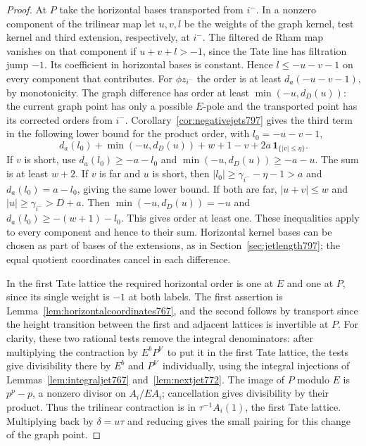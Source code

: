 \documentclass[a4paper,11pt]{article}
\theoremstyle{definition}
\theoremstyle{remark}
\numberwithin{equation}{section}
\begin{document}
\begin{proof}
At \(P\) take the horizontal bases transported from \(i^-\).
In a nonzero component of the trilinear map let \(u,v,l\)
be the weights of the graph kernel, test kernel and third
extension, respectively, at \(i^-\). The filtered de Rham
map vanishes on that component if \(u+v+l>-1\), since
the Tate line has filtration jump \(-1\). Its coefficient
in horizontal bases is constant. Hence \(l\le -u-v-1\)
on every component that contributes. For \(\phi z_{i^-}\)
the order is at least \(d_a(-u-v-1)\), by monotonicity.
The graph difference has order at least \(\min(-u,d_D(u))\):
the current graph point has only a possible \(E\)-pole
and the transported point has its corrected orders from
\(i^-\). Corollary~\ref{cor:negativejets797} gives the
third term in the following lower bound for the product order,
with \(l_0=-u-v-1\),
\[
           d_a(l_0)+\min(-u,d_D(u))
                + w+1-v+2a\,\mathbf 1_{\{|v|\le\eta\}} .
\]
If \(v\) is short, use \(d_a(l_0)\ge-a-l_0\) and
\(\min(-u,d_D(u))\ge-a-u\). The sum is at least \(w+2\).
If \(v\) is far and \(u\) is short, then
\(|l_0|\ge\gamma_{i^-}-\eta-1>a\) and \(d_a(l_0)=a-l_0\),
giving the same lower bound. If both are far,
\(|u+v|\le w\) and \(|u|\ge\gamma_{i^-}>D+a\).
Then \(\min(-u,d_D(u))=-u\) and
\(d_a(l_0)\ge-(w+1)-l_0\). This gives order at least one.
These inequalities apply to every component and hence to
their sum. Horizontal kernel bases can be chosen as part
of bases of the extensions, as in Section~\ref{sec:jetlength797};
the equal quotient coordinates cancel in each difference.

In the first Tate lattice the required horizontal order is
one at \(E\) and one at \(P\), since its single weight is
\(-1\) at both labels. The first assertion is
Lemma~\ref{lem:horizontalcoordinates767}, and the second
follows by transport since the height transition between
the first and adjacent lattices is invertible at \(P\).
For clarity, these two rational tests remove the integral
denominators: after multiplying the contraction by
\(E^bP^{b'}\) to put it in the first Tate lattice, the
tests give divisibility there by \(E^b\) and \(P^{b'}\)
individually, using the integral injections of
Lemmas~\ref{lem:integraljet767} and~\ref{lem:nextjet772}.
The image of \(P\) modulo \(E\) is \(p^p-p\), a nonzero
divisor on \(A_i/EA_i\); cancellation gives divisibility
by their product. Thus the trilinear contraction is in
\(\tau^{-1}A_i(1)\), the first Tate lattice. Multiplying
back by \(\delta=u\tau\) and reducing gives the small
pairing for this change of the graph point.


\end{proof}
\end{document}
